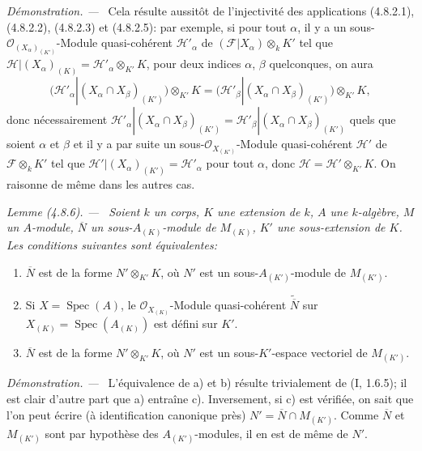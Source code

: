 \documentclass[10pt,oneside]{book}
\newcommand{\oldpage}[2][]{%
  \setcounter{footnote}{0}%
  \marginpar{\scriptsize\textbf{#1}~|~#2}\ignorespaces}
\newenvironment{lemma}[1][]{%
  \par\medskip\noindent\itshape Lemme (#1). ---\ }{\par}
\newenvironment{proof}{%
  \par\medskip\noindent\textit{Démonstration. ---\ }}{\par}
\begin{document}
\begin{proof}
Cela résulte aussitôt de l'injectivité des applications (4.8.2.1), (4.8.2.2),
(4.8.2.3) et (4.8.2.5): par exemple, si pour tout $\alpha$, il y a un
sous-$\mathcal O_{(X_\alpha)_{(K')}}$-Module quasi-cohérent
$\mathscr H'_\alpha$ de $(\mathscr F|X_\alpha)\otimes_kK'$ tel que
$\mathscr H|(X_\alpha)_{(K)}=\mathscr H'_\alpha\otimes_{K'}K$, pour deux
indices $\alpha$, $\beta$ quelconques, on aura
\[
\bigl(\mathscr H'_\alpha|(X_\alpha\cap X_\beta)_{(K')}\bigr)
 \otimes_{K'}K
=\bigl(\mathscr H'_\beta|(X_\alpha\cap X_\beta)_{(K')}\bigr)
 \otimes_{K'}K,
\]
donc nécessairement
$\mathscr H'_\alpha|(X_\alpha\cap X_\beta)_{(K')}
=\mathscr H'_\beta|(X_\alpha\cap X_\beta)_{(K')}$ quels que soient
$\alpha$ et $\beta$ et il y a par suite un sous-$\mathcal O_{X_{(K')}}$-Module
quasi-cohérent $\mathscr H'$ de $\mathscr F\otimes_kK'$ tel que
$\mathscr H'|(X_\alpha)_{(K')}=\mathscr H'_\alpha$ pour tout $\alpha$, donc
$\mathscr H=\mathscr H'\otimes_{K'}K$. On raisonne de même dans les autres
cas.
\end{proof}

\begin{lemma}[4.8.6]
\label{IV.2.4.8.6-fr}
Soient $k$ un corps, $K$ une extension de $k$, $A$ une $k$-algèbre, $M$ un
$A$-module, $\overline N$ un sous-$A_{(K)}$-module de $M_{(K)}$, $K'$ une
sous-extension de $K$. Les conditions suivantes sont équivalentes:
\begin{enumerate}
\item[a)] $\overline N$ est de la forme $N'\otimes_{K'}K$, où $N'$ est un
sous-$A_{(K')}$-module de $M_{(K')}$. 
\item[b)] Si $X=\operatorname{Spec}(A)$, le
$\mathcal O_{X_{(K)}}$-Module quasi-cohérent $\widetilde{\overline N}$ sur
$X_{(K)}=\operatorname{Spec}(A_{(K)})$ est défini sur $K'$.
\item[c)] $\overline N$ est de la forme $N'\otimes_{K'}K$, où $N'$ est un
sous-$K'$-espace vectoriel de $M_{(K')}$. 
\end{enumerate}
\end{lemma}

\oldpage[IV-2]{82}

\begin{proof}
L'équivalence de a) et b) résulte trivialement de (I, 1.6.5); il est clair
d'autre part que a) entraîne c). Inversement, si c) est vérifiée, on sait que
l'on peut écrire (à identification canonique près)
$N'=\overline N\cap M_{(K')}$. Comme $\overline N$ et $M_{(K')}$ sont par
hypothèse des $A_{(K')}$-modules, il en est de même de $N'$.
\end{proof}
\end{document}
